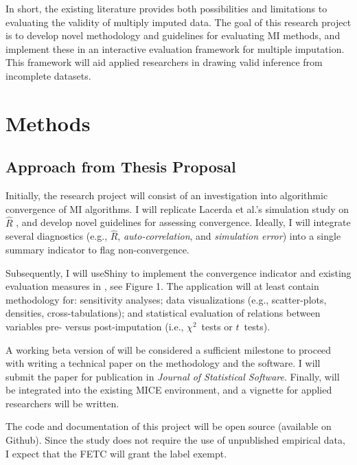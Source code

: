 \documentclass[article]{jss}
\begin{document}
In short, the existing literature provides both possibilities and limitations to evaluating the validity of multiply imputed data. The goal of this research project is to develop novel methodology and guidelines for evaluating MI methods, and implement these in an interactive evaluation framework for multiple imputation. This framework will aid applied researchers in drawing valid inference from incomplete datasets. 




\section{Methods} \label{sec:methods}

\subsection{Approach from Thesis Proposal}

Initially, the research project will consist of an investigation into algorithmic convergence of MI algorithms. I will replicate Lacerda et al.'s simulation study on $\widehat{R}$ \citep{lace07}, and develop novel guidelines for assessing convergence. Ideally, I will integrate several diagnostics (e.g., $\widehat{R}$, \emph{auto-correlation}, and \emph{simulation error}) into a single summary indicator to flag non-convergence. 

Subsequently, I will useShiny \citep{shiny} to implement the convergence indicator and existing evaluation measures in , see Figure 1. The application will at least contain methodology for: sensitivity analyses; data visualizations (e.g., scatter-plots, densities, cross-tabulations); and statistical evaluation of relations between variables pre- versus post-imputation (i.e., $\chi^2$~tests or $t$~tests).

A working beta version of  will be considered a sufficient milestone to proceed with writing a technical paper on the methodology and the software. I will submit the paper for publication in \emph{Journal of Statistical Software}. Finally,  will be integrated into the existing MICE environment, and a vignette for applied researchers will be written. 

The  code and documentation of this project will be open source (available on Github). Since the study does not require the use of unpublished empirical data, I expect that the FETC will grant the label exempt. 
\end{document}
